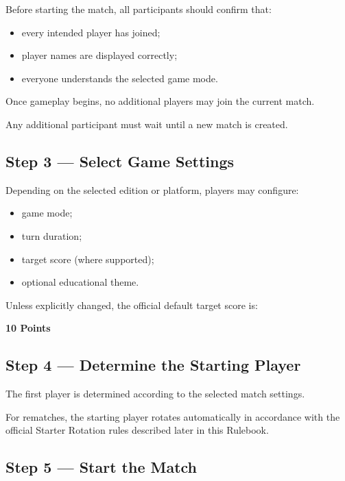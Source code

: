 \documentclass[11pt,a4paper]{article}
\begin{document}
Before starting the match, all participants should confirm that:

\begin{itemize}
    \item every intended player has joined;
    \item player names are displayed correctly;
    \item everyone understands the selected game mode.
\end{itemize}

Once gameplay begins, no additional players may join the current match.

Any additional participant must wait until a new match is created.

\subsection{Step 3 --- Select Game Settings}

Depending on the selected edition or platform, players may configure:

\begin{itemize}
    \item game mode;
    \item turn duration;
    \item target score (where supported);
    \item optional educational theme.
\end{itemize}

Unless explicitly changed, the official default target score is:

\begin{center}
\Large \textbf{10 Points}
\end{center}

\subsection{Step 4 --- Determine the Starting Player}

The first player is determined according to the selected match settings.

For rematches, the starting player rotates automatically in accordance with the official Starter Rotation rules described later in this Rulebook.

\subsection{Step 5 --- Start the Match}
\end{document}
